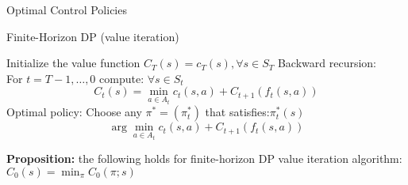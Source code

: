 
Optimal Control Policies
\begin{greyboxedalgorithm}
\vspace{-0.5cm}
\begin{algorithm}[H]
\caption{Finite-Horizon DP (value iteration)}
\begin{small}

\begin{algorithmic}[1]
\STATE Initialize the value function $C_T(s) = c_T(s),\forall s \in S_T$
\STATE Backward recursion: \\For $t = T - 1, \ldots ,0$  compute: $\forall s \in S_t$ $$ C_t(s) = \min_{a \in A_t} {c_t(s, a) + C_{t+1}(f_t(s, a))}$$
\STATE Optimal policy: Choose any $\pi^* = (\pi_t^*)$ that satisfies:$\pi_t^*(s)$ $$ \arg \min_{a \in A_t} {c_t(s, a) + C_{t+1}(f_t(s, a))}$$
\end{algorithmic}
\end{small}
\end{algorithm}
\end{greyboxedalgorithm}


\textbf{Proposition:} the following holds for finite-horizon DP value iteration algorithm: $C_0(s) = \min_\pi C_0(\pi; s)$

